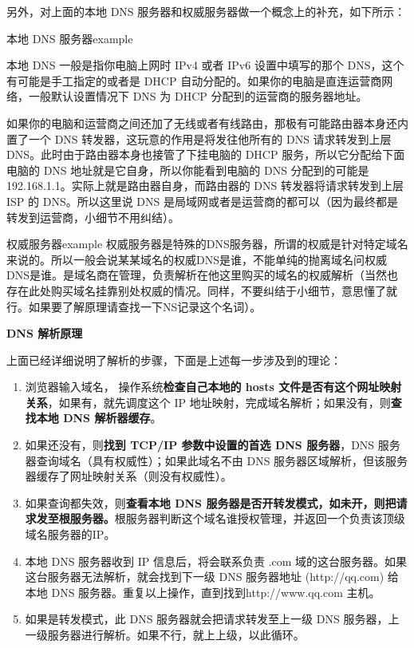 \documentclass[cn,11pt,color=blue,lang=cn]{elegantbook}
\begin{document}
\begin{solution}
另外，对上面的本地 DNS 服务器和权威服务器做一个概念上的补充，如下所示：
\begin{myDefinition}{本地 DNS 服务器}{example}

本地 DNS 一般是指你电脑上网时 IPv4 或者 IPv6 设置中填写的那个 DNS，这个有可能是手工指定的或者是 DHCP 自动分配的。如果你的电脑是直连运营商网络，一般默认设置情况下 DNS 为 DHCP 分配到的运营商的服务器地址。

如果你的电脑和运营商之间还加了无线或者有线路由，那极有可能路由器本身还内置了一个 DNS 转发器，这玩意的作用是将发往他所有的 DNS 请求转发到上层 DNS。此时由于路由器本身也接管了下挂电脑的 DHCP 服务，所以它分配给下面电脑的 DNS 地址就是它自身，所以你能看到电脑的 DNS 分配到的可能是 192.168.1.1。实际上就是路由器自身，而路由器的 DNS 转发器将请求转发到上层 ISP 的 DNS。所以这里说 DNS 是局域网或者是运营商的都可以（因为最终都是转发到运营商，小细节不用纠结）。
\end{myDefinition}

\begin{myDefinition}{权威服务器}{example}
权威服务器是特殊的DNS服务器，所谓的权威是针对特定域名来说的。所以一般会说某某域名的权威DNS是谁，不能单纯的抛离域名问权威DNS是谁。是域名商在管理，负责解析在他这里购买的域名的权威解析（当然也存在此处购买域名挂靠别处权威的情况。同样，不要纠结于小细节，意思懂了就行。如果要了解原理请查找一下NS记录这个名词）。
\end{myDefinition}

\begin{note} \textbf{DNS 解析原理} \end{note}
上面已经详细说明了解析的步骤，下面是上述每一步涉及到的理论：
\begin{enumerate} 
	\item 浏览器输入域名， 操作系统\textbf{检查自己本地的 hosts 文件是否有这个网址映射关系}，如果有，就先调度这个 IP 地址映射，完成域名解析；如果没有，则\textbf{查找本地 DNS 解析器缓存}。
	\item 如果还没有，则\textbf{找到 TCP/IP 参数中设置的首选 DNS 服务器}，DNS 服务器查询域名（具有权威性）；如果此域名不由 DNS 服务器区域解析，但该服务器缓存了网址映射关系（则没有权威性）。
	\item 如果查询都失效，则\textbf{查看本地 DNS 服务器是否开转发模式，如未开，则把请求发至根服务器。}根服务器判断这个域名谁授权管理，并返回一个负责该顶级域名服务器的IP。
	\item 本地 DNS 服务器收到 IP 信息后，将会联系负责 .com 域的这台服务器。如果这台服务器无法解析，就会找到下一级 DNS 服务器地址 (http://qq.com) 给本地 DNS 服务器。重复以上操作，直到找到http://www.qq.com 主机。
	\item 如果是转发模式，此 DNS 服务器就会把请求转发至上一级 DNS 服务器，上一级服务器进行解析。如果不行，就上上级，以此循环。
\end{enumerate}
\end{solution}
\end{document}
